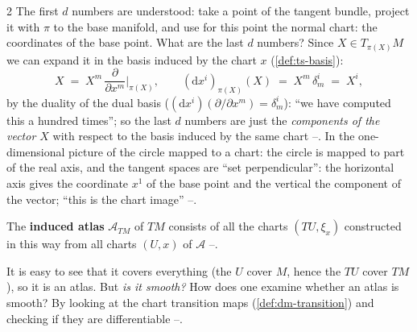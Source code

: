 \begin{paracol}{2}
The first $d$ numbers are understood: take a point of the tangent bundle, project it with $\pi$ to the base manifold, and use for this point the normal chart: the coordinates of the base point. What are the last $d$ numbers? Since $X\in T_{\pi(X)}M$ we can expand it in the basis induced by the chart $x$ (\cref{def:ts-basis}):
\begin{equation}\label{eq:lag-comp}
  X\;=\;X^m\,\frac{\partial}{\partial x^m}\bigg|_{\pi(X)},\qquad (\mathrm dx^i)_{\pi(X)}(X)\;=\;X^m\,\delta^i_m\;=\;X^i ,
\end{equation}
by the duality of the dual basis ($(\mathrm dx^i)(\partial/\partial x^m)=\delta^i_m$): ``we have computed this a hundred times''; so the last $d$ numbers are just the \emph{components of the vector $X$} with respect to the basis induced by the same chart --. In the one-dimensional picture of the circle mapped to a chart: the circle is mapped to part of the real axis, and the tangent spaces are ``set perpendicular'': the horizontal axis gives the coordinate $x^1$ of the base point and the vertical the component of the vector; ``this is the chart image'' --.

\begin{definition}\label{def:lag-atlas}
The \textbf{induced atlas} $\mathcal A_{TM}$ of $TM$ consists of all the charts $(TU,\xi_x)$ constructed in this way from all charts $(U,x)$ of $\mathcal A$ --.
\end{definition}
It is easy to see that it covers everything (the $U$ cover $M$, hence the $TU$ cover $TM$), so it is an atlas. But \emph{is it smooth?} How does one examine whether an atlas is smooth? By looking at the chart transition maps (\cref{def:dm-transition}) and checking if they are differentiable --.


\end{paracol}
